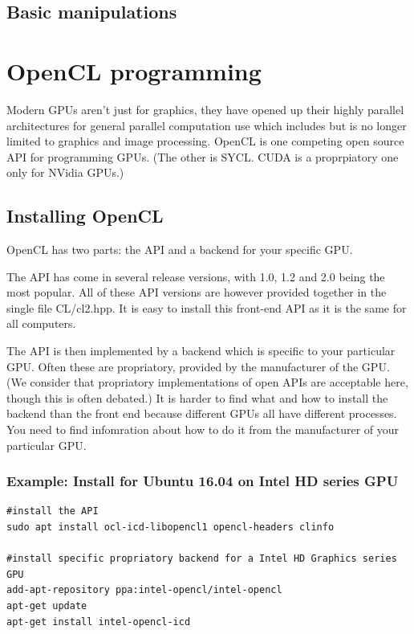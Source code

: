 \documentclass[oneside,english]{scrbook}
\begin{document}



\section{Basic manipulations}



\chapter{OpenCL programming}

Modern GPUs aren't just for graphics, they have opened up their highly parallel architectures for general parallel computation use which includes but is no longer limited to graphics and image processing.   OpenCL is one competing open source API for programming GPUs.   (The other is SYCL. CUDA is a proprpiatory one only for NVidia GPUs.)

\section{Installing OpenCL}

OpenCL has two parts: the API and a backend for your specific GPU.   

The API has come in several release versions, with 1.0, 1.2 and 2.0 being the most popular.  All of these API versions are however provided together in the single file CL/cl2.hpp.  It is easy to install this front-end API as it is the same for all computers.

The API is then implemented by a backend which is specific to your particular GPU. Often these are propriatory, provided by the manufacturer of the GPU.  (We consider that propriatory implementations of open APIs are acceptable here, though this is often debated.)    It is harder to find what and how to install the backend than the front end because different GPUs all have different processes.  You need to find infomration about how to do it from the manufacturer of your particular GPU.

\subsection{Example: Install for Ubuntu 16.04 on Intel HD series GPU}

\begin{lstlisting}
#install the API
sudo apt install ocl-icd-libopencl1 opencl-headers clinfo

#install specific propriatory backend for a Intel HD Graphics series GPU
add-apt-repository ppa:intel-opencl/intel-opencl
apt-get update
apt-get install intel-opencl-icd
\end{lstlisting}
\end{document}
